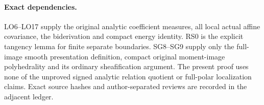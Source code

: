 \paragraph{Exact dependencies.}
LO6--LO17 supply the original analytic coefficient measures, all local
actual affine covariance, the biderivation and compact energy identity.
RS0 is the explicit tangency lemma for finite separate boundaries.
SG8--SG9 supply only the full-image smooth presentation definition,
compact original moment-image polyhedrality and its ordinary
sheafification argument.  The present proof uses none of the
unproved signed analytic relation quotient or full-polar localization
claims.  Exact source hashes and author-separated reviews are recorded
in the adjacent ledger.
